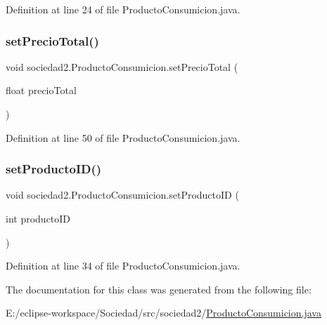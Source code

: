 Definition at line 24 of file Producto\+Consumicion.\+java.

\mbox{\label{classsociedad2_1_1_producto_consumicion_adffac28a284684e44d79ac564ef5943a}} 
\subsubsection{\texorpdfstring{set\+Precio\+Total()}{setPrecioTotal()}}
{\footnotesize\ttfamily void sociedad2.\+Producto\+Consumicion.\+set\+Precio\+Total (\begin{DoxyParamCaption}\item[{float}]{precio\+Total }\end{DoxyParamCaption})}



Definition at line 50 of file Producto\+Consumicion.\+java.

\mbox{\label{classsociedad2_1_1_producto_consumicion_a0fe9398fbe6b1d063d39d0398f6f87fa}} 
\subsubsection{\texorpdfstring{set\+Producto\+I\+D()}{setProductoID()}}
{\footnotesize\ttfamily void sociedad2.\+Producto\+Consumicion.\+set\+Producto\+ID (\begin{DoxyParamCaption}\item[{int}]{producto\+ID }\end{DoxyParamCaption})}



Definition at line 34 of file Producto\+Consumicion.\+java.



The documentation for this class was generated from the following file\+:\begin{DoxyCompactItemize}
\item 
E\+:/eclipse-\/workspace/\+Sociedad/src/sociedad2/\mbox{\hyperlink{_producto_consumicion_8java}{Producto\+Consumicion.\+java}}\end{DoxyCompactItemize}
